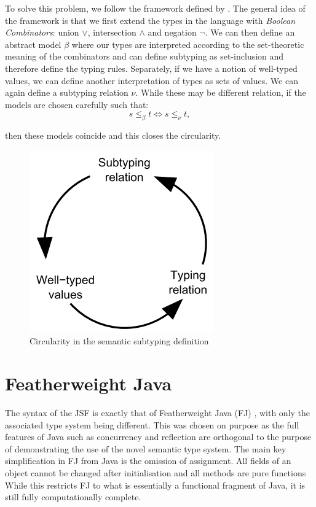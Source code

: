 \documentclass{l4proj}
\begin{document}
To solve this problem, we follow the framework defined by \citet{Frisch2008}.
The general idea of the framework is that we first extend the types in the language with \emph{Boolean Combinators}: union $\lor$, intersection $\land$ and negation $\neg$.
We can then define an abstract model $\beta$ where our types are interpreted according to the set-theoretic meaning of the combinators and can define subtyping as set-inclusion and therefore define the typing rules.
Separately, if we have a notion of well-typed values, we can define another interpretation of types as sets of values.
We can again define a subtyping relation $\nu$.
While these may be different relation, if the models are chosen carefully such that:
\begin{equation*}
    s \leq_{\beta} t \iff s \leq_{\nu} t,
\end{equation*}

then these models coincide and this closes the circularity.

\begin{figure}
    \centering
    \includegraphics[width=0.4\linewidth]{images/circularity.PNG}
    \caption{Circularity in the semantic subtyping definition \citep{Castagna2005}}
    \label{fig:circ}
\end{figure}

\section{Featherweight Java}

The syntax of the JSF is exactly that of Featherweight Java (FJ) \citep{Igarashi1999}, with only the associated type system being different.
This was chosen on purpose as the full features of Java such as concurrency and reflection are orthogonal to the purpose of demonstrating the use of the novel semantic type system.
The main key simplification in FJ from Java is the omission of assignment.
All fields of an object cannot be changed after initialisation and all methods are pure functions
While this restricts FJ to what is essentially a functional fragment of Java, it is still fully computationally complete.
\end{document}
